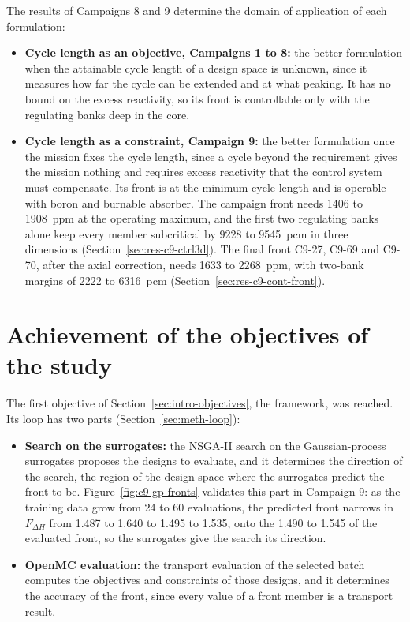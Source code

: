 The results of Campaigns 8 and 9 determine the domain of application
of each formulation:

\begin{itemize}
  \item \textbf{Cycle length as an objective, Campaigns 1 to 8:} the
        better formulation when the attainable cycle length of a design
        space is unknown, since it measures how far the cycle can be
        extended and at what peaking. It has no bound on the excess
        reactivity, so its front is controllable only with the
        regulating banks deep in the core.
  \item \textbf{Cycle length as a constraint, Campaign 9:} the better
        formulation once the mission fixes the cycle length, since a
        cycle beyond the requirement gives the mission nothing and
        requires excess reactivity that the control system must
        compensate. Its front is at the minimum cycle length and is
        operable with boron and burnable absorber. The campaign front
        needs 1406 to \SI{1908}{ppm} at the operating maximum, and the
        first two regulating banks alone keep every member subcritical
        by 9228 to \SI{9545}{pcm} in three dimensions
        (Section~\ref{sec:res-c9-ctrl3d}). The final front C9-27, C9-69
        and C9-70, after the axial correction, needs 1633 to
        \SI{2268}{ppm}, with two-bank margins of 2222 to \SI{6316}{pcm}
        (Section~\ref{sec:res-c9-cont-front}).
\end{itemize}

\section{Achievement of the objectives of the study}
\label{sec:concl-candidates}

The first objective of Section~\ref{sec:intro-objectives}, the
framework, was reached. Its loop has two parts
(Section~\ref{sec:meth-loop}):

\begin{itemize}
  \item \textbf{Search on the surrogates:} the NSGA-II search on the
        Gaussian-process surrogates proposes the designs to evaluate,
        and it determines the direction of the search, the region of
        the design space where the surrogates predict the front to be.
        Figure~\ref{fig:c9-gp-fronts} validates this part in Campaign 9:
        as the training data grow from 24 to 60 evaluations, the
        predicted front narrows in $F_{\Delta H}$ from 1.487 to 1.640 to
        1.495 to 1.535, onto the 1.490 to 1.545 of the evaluated front,
        so the surrogates give the search its direction.
  \item \textbf{OpenMC evaluation:} the transport evaluation of the
        selected batch computes the objectives and constraints of those
        designs, and it determines the accuracy of the front, since
        every value of a front member is a transport result.
\end{itemize}

